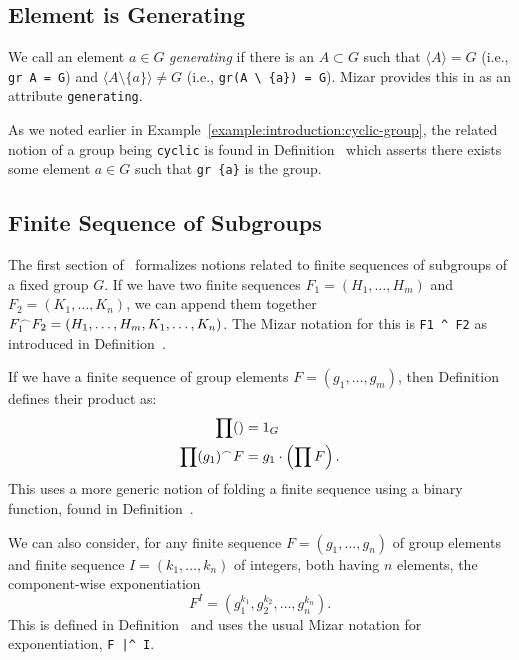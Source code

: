 \subsection{Element is Generating}
We call an element $a\in G$ \emph{generating} if there is an $A\subset G$
such that $\langle A\rangle = G$ (i.e., \lstinline{gr A = G}) and
$\langle A\setminus\{a\}\rangle\neq G$ (i.e., \lstinline!gr(A \ {a}) = G!).
Mizar provides this in  as
an attribute \lstinline{generating}.

As we noted earlier in Example~\ref{example:introduction:cyclic-group},
the related notion of a group being \lstinline{cyclic} is found in
Definition~
which asserts there exists some element $a\in G$ such that \lstinline!gr {a}!
is the group.

\subsection{Finite Sequence of Subgroups}
The first section of~ formalizes notions related to finite
sequences of subgroups of a fixed group $G$. If we have two finite
sequences $F_{1}=(H_{1},\dots,H_{m})$ and $F_{2}=(K_{1},\dots,K_{n})$,
we can append them together $F_{1}^{\frown} F_{2}=(H_{1},\dots,H_{m},K_{1},\dots,K_{n})$.
The Mizar notation for this is \lstinline{F1 ^ F2} as introduced in
Definition~.

If we have a finite sequence of group elements $F=(g_{1},\dots,g_{m})$,
then Definition~ defines their product as:
\begin{subequations}
  \begin{align}
    \prod () &= 1_{G}\\
    \prod (g_{1})^{\frown} F &= g_{1}\cdot\left(\prod F\right).
  \end{align}
\end{subequations}
This uses a more generic notion of folding a finite sequence using a
binary function, found in Definition~.

We can also consider, for any finite sequence $F=(g_{1},\dots, g_{n})$ of
group elements and finite sequence $I=(k_{1},\dots,k_{n})$ of integers,
both having $n$ elements, the component-wise exponentiation
\begin{equation}
  F^{I} = (g_{1}^{k_{1}}, g_{2}^{k_{2}}, \dots, g_{n}^{k_{n}}).
\end{equation}
This is defined in Definition~ and uses the usual
Mizar notation for exponentiation, \lstinline{F |^ I}.

